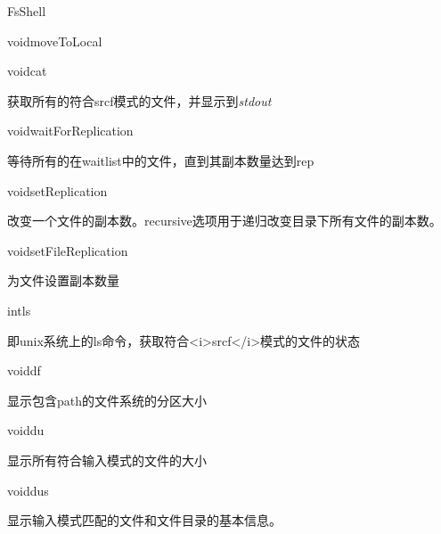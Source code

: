 \begin{XeClass}{FsShell}
\begin{XeMethod}{}{void}{moveToLocal}
    \end{XeMethod}

    \begin{XeMethod}{}{void}{cat}
         
 获取所有的符合srcf模式的文件，并显示到\emph{stdout}

    \end{XeMethod}

    \begin{XeMethod}{}{void}{waitForReplication}
         
 等待所有的在waitlist中的文件，直到其副本数量达到rep

    \end{XeMethod}

    \begin{XeMethod}{}{void}{setReplication}
         
 改变一个文件的副本数。recursive选项用于递归改变目录下所有文件的副本数。

    \end{XeMethod}

    \begin{XeMethod}{\XePrivate}{void}{setFileReplication}
         
 为文件设置副本数量

    \end{XeMethod}

    \begin{XeMethod}{\XePrivate}{int}{ls}
         
 即unix系统上的ls命令，获取符合<i>srcf</i>模式的文件的状态

    \end{XeMethod}

    \begin{XeMethod}{}{void}{df}
         
 显示包含path的文件系统的分区大小

    \end{XeMethod}

    \begin{XeMethod}{}{void}{du}
         
 显示所有符合输入模式的文件的大小

    \end{XeMethod}

    \begin{XeMethod}{}{void}{dus}
         
 显示输入模式匹配的文件和文件目录的基本信息。

    \end{XeMethod}


\end{XeClass}
